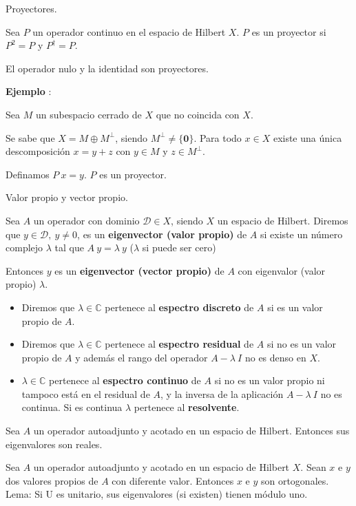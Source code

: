 \begin{defi} Proyectores.

Sea $P$ un operador continuo en el espacio de Hilbert $X$. $P$ es un proyector si $P^{2} = P$ y $P^{\dagger} =  P$.

El operador nulo y la identidad son proyectores.
\end{defi}
\textbf{Ejemplo} :

Sea $M$ un subespacio cerrado de $X$ que no coincida con $X$. 

Se sabe que $X =  M \oplus M^{\perp}$, siendo $M^{\perp} \neq \{ \bm{0} \}$. Para todo $x \in X$ existe una única descomposición $x = y + z$ con $y \in M$ y $z \in M^{\perp}$.

Definamos $P \: x = y$. $P$ es un proyector.
\begin{defi} Valor propio y vector propio.

Sea $A$ un operador con dominio $\mathcal{D} \in X$, siendo $X$ un espacio de Hilbert. Diremos que $y \in \mathcal{D}, \: y \neq 0$, es un \textbf{eigenvector (valor propio)} de $A$ si existe un número complejo $\lambda$ tal que $A \: y = \lambda \: y$ ($\lambda$ si puede ser cero)

Entonces $y$ es un \textbf{eigenvector (vector propio)} de $A$ con
eigenvalor (valor propio) $\lambda$.
\end{defi}
\begin{itemize}[label=\checkmark]
\item Diremos que $\lambda \in \mathbb{C}$ pertenece al \textbf{espectro discreto} de $A$ si es un valor propio de $A$.
\item Diremos que $\lambda \in \mathbb{C}$ pertenece al \textbf{espectro residual} de $A$ si no es un valor propio de $A$ y además el rango del operador $A - \lambda \: I$ no es denso en $X$.
\item $\lambda \in \mathbb{C}$ pertenece al \textbf{espectro continuo} de $A$ si no es un valor propio ni tampoco está en el residual de $A$, y la inversa de la aplicación $A - \lambda \: I$ no es continua. Si es continua $\lambda$ pertenece al \textbf{resolvente}.
\end{itemize}
\begin{lema}
Sea $A$ un operador autoadjunto y acotado en un espacio de Hilbert. Entonces sus eigenvalores son reales.
\end{lema}
\begin{lema}
Sea $A$ un operador autoadjunto y acotado en un espacio de Hilbert $X$. Sean $x$ e $y$ dos valores propios de $A$ con diferente valor. Entonces $x$ e $y$ son ortogonales.
    Lema: Si U es unitario, sus eigenvalores (si existen) tienen
    módulo uno.

\end{lema}

